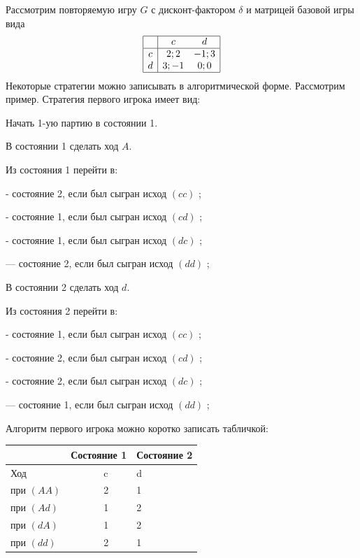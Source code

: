 \begin{problem}

Рассмотрим повторяемую игру  $G$  с дисконт-фактором  $\delta $  и матрицей базовой игры вида
\[\begin{array}{|c|cc|}  \hline {} & {c} & {d} \\  \hline {c} & {2;2} & {-1;3} \\ {d} & {3;-1} & {0;0} \\  \hline  \end{array}\]
Некоторые стратегии можно записывать в алгоритмической форме. Рассмотрим пример.
Стратегия первого игрока имеет вид:\par
Начать 1-ую партию в состоянии 1.\par
В состоянии 1 сделать ход  $A$.\par
Из состояния 1 перейти в:\par
- состояние 2, если был сыгран исход  $\left(cc\right)$ ;\par
- состояние 1, если был сыгран исход  $\left(cd\right)$ ;\par
- состояние 1, если был сыгран исход  $\left(dc\right)$ ;\par
       --- состояние 2, если был сыгран исход  $\left(dd\right)$ ;\par
В состоянии 2 сделать ход  $d$.\par
Из состояния 2 перейти в:\par
- состояние 1, если был сыгран исход  $\left(cc\right)$ ;\par
- состояние 2, если был сыгран исход  $\left(cd\right)$ ;\par
- состояние 2, если был сыгран исход  $\left(dc\right)$ ;\par
       --- состояние 1, если был сыгран исход  $\left(dd\right)$ ;\par
Алгоритм первого игрока можно коротко записать табличкой:


\begin{tabular} {|p{43.12pt}| p{19.60pt}| p{37.52pt}| p{19.60pt}| p{31.92pt}| } \hline
   &  \multicolumn{2}{|l|}{ Состояние 1 } &  \multicolumn{2}{|l|}{ Состояние 2 } \\ \hline
 \multicolumn{2}{|l|}{ Ход } &  \multicolumn{2}{|l|}{ c } &  d  \\ \hline
 \multicolumn{2}{|l|}{ при  $\left(AA\right)$  } &  \multicolumn{2}{|l|}{ 2 } &  1  \\ \hline
 \multicolumn{2}{|l|}{ при  $\left(Ad\right)$  } &  \multicolumn{2}{|l|}{ 1 } &  2  \\ \hline
 \multicolumn{2}{|l|}{ при  $\left(dA\right)$  } &  \multicolumn{2}{|l|}{ 1 } &  2  \\ \hline
 \multicolumn{2}{|l|}{ при  $\left(dd\right)$  } &  \multicolumn{2}{|l|}{ 2 } &  1  \\ \hline
\end{tabular}


\end{problem}
